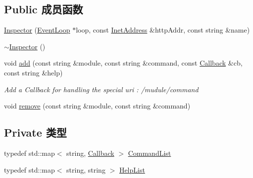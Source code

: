 \subsection*{Public 成员函数}
\begin{DoxyCompactItemize}
\item 
\hyperlink{classmuduo_1_1net_1_1Inspector_a42616b7b1bc438718f4924033c1f3267}{Inspector} (\hyperlink{classmuduo_1_1net_1_1EventLoop}{Event\+Loop} $\ast$loop, const \hyperlink{classmuduo_1_1net_1_1InetAddress}{Inet\+Address} \&http\+Addr, const string \&name)
\item 
\hyperlink{classmuduo_1_1net_1_1Inspector_ad5c735d364e9c38d5a9e8b3dc6755e83}{$\sim$\+Inspector} ()
\item 
void \hyperlink{classmuduo_1_1net_1_1Inspector_a687e88cdd98d2de0f634f45b37dadc03}{add} (const string \&module, const string \&command, const \hyperlink{classmuduo_1_1net_1_1Inspector_a9b3d030deba315670a7da29b78586217}{Callback} \&cb, const string \&help)
\begin{DoxyCompactList}\small\item\em Add a Callback for handling the special uri \+: /mudule/command \end{DoxyCompactList}\item 
void \hyperlink{classmuduo_1_1net_1_1Inspector_a78f18a8b4a77bcf0267d41f973856ee9}{remove} (const string \&module, const string \&command)
\end{DoxyCompactItemize}
\subsection*{Private 类型}
\begin{DoxyCompactItemize}
\item 
typedef std\+::map$<$ string, \hyperlink{classmuduo_1_1net_1_1Inspector_a9b3d030deba315670a7da29b78586217}{Callback} $>$ \hyperlink{classmuduo_1_1net_1_1Inspector_a00ae736a47d9b5825c815a1c8aeeaeab}{Command\+List}
\item 
typedef std\+::map$<$ string, string $>$ \hyperlink{classmuduo_1_1net_1_1Inspector_a45483c7152afba31eaf21e58681f619e}{Help\+List}
\end{DoxyCompactItemize}
